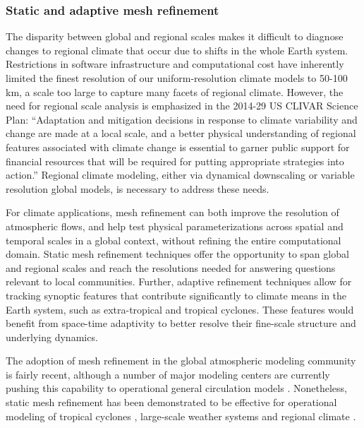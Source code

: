 \documentclass[11pt]{article}
\begin{document}
\subsubsection{Static and adaptive mesh refinement} \label{sec:Refinement}

The disparity between global and regional scales makes it difficult to diagnose changes to regional climate that occur due to shifts in the whole Earth system.  Restrictions in software infrastructure and computational cost have inherently limited the finest resolution of our uniform-resolution climate models to 50-100 km, a scale too large to capture many facets of regional climate.  However, the need for regional scale analysis is emphasized in the 2014-29 US CLIVAR Science Plan: ``Adaptation and mitigation decisions in response to climate variability and change are made at a local scale, and a better physical understanding of regional features associated with climate change is essential to garner public support for financial resources that will be required for putting appropriate strategies into action.''  Regional climate modeling, either via dynamical downscaling or variable resolution global models, is necessary to address these needs.

For climate applications, mesh refinement can both improve the resolution of atmospheric flows, and help test physical parameterizations across spatial and temporal scales in a global context, without refining the entire computational domain.  Static mesh refinement techniques offer the opportunity to span global and regional scales and reach the resolutions needed for answering questions relevant to local communities.  Further, adaptive refinement techniques allow for tracking synoptic features that contribute significantly to climate means in the Earth system, such as extra-tropical and tropical cyclones.  These features would benefit from space-time adaptivity to better resolve their fine-scale structure and underlying dynamics.

The adoption of mesh refinement in the global atmospheric modeling community is fairly recent, although a number of major modeling centers are currently pushing this capability to operational general circulation models \cite{skamarock2012mpas, LMHSJL2013MWR, CMZCJMAT2013MWR, mccorquodale2014adaptive}.   Nonetheless, static mesh refinement has been demonstrated to be effective for operational modeling of tropical cyclones \cite{zarzycki2014multidecadal, zarzycki2014using}, large-scale weather systems \cite{rauscher2014impact} and regional climate \cite{rauscher2013exploring, zarzycki2014aquaplanet}.
\end{document}
